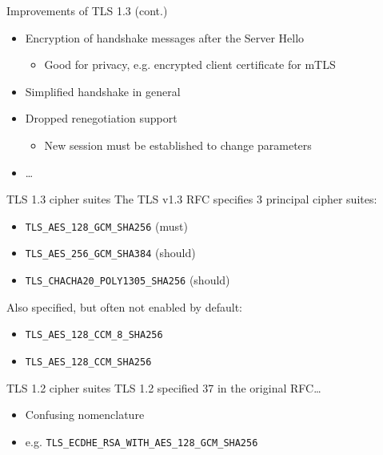\begin{frame}{Improvements of TLS 1.3 (cont.)}
  \begin{itemize}[<+(1)->]
    \item Encryption of handshake messages after the Server Hello
    \begin{itemize}
      \item Good for privacy, e.g. encrypted client certificate for mTLS
    \end{itemize}
    \item Simplified handshake in general
    \item Dropped renegotiation support
    \begin{itemize}
      \item New session must be established to change parameters
    \end{itemize}
    \item \dots
  \end{itemize}
\end{frame}

\begin{frame}{TLS 1.3 cipher suites}
  The TLS v1.3 RFC specifies 3 principal cipher suites:
  \pause
  \begin{itemize}
    \item {\small\texttt{TLS\_AES\_128\_GCM\_SHA256}} (must)
    \item {\small\texttt{TLS\_AES\_256\_GCM\_SHA384}} (should)
    \item {\small\texttt{TLS\_CHACHA20\_POLY1305\_SHA256}} (should)
  \end{itemize}

  \vspace*{1em}

  \pause
  Also specified, but often not enabled by default:
  \begin{itemize}
    \item {\small\texttt{TLS\_AES\_128\_CCM\_8\_SHA256}}
    \item {\small\texttt{TLS\_AES\_128\_CCM\_SHA256}}
  \end{itemize}
\end{frame}

\begin{frame}{TLS 1.2 cipher suites}
  TLS 1.2 specified 37 in the original RFC\dots
  \begin{itemize}
    \item Confusing nomenclature
    \item e.g. {\small\texttt{TLS\_ECDHE\_RSA\_WITH\_AES\_128\_GCM\_SHA256}}
  \end{itemize}
\end{frame}

